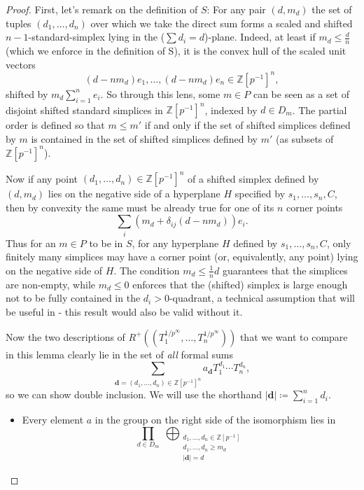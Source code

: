 \documentclass[10pt,a4paper]{amsart}
\newcommand{\ZZip}{\ZZ[p^{-1}]}
\newcommand{\ZZ}{\mathbb{Z}}
\newcommand{\pRoots}{{1/p^\infty}}
\begin{document}
\begin{proof}
    First, let's remark on the definition of \(S\): For any pair \((d,m_d)\) the set of tuples \((d_1,\dots,d_n)\) over which we take the direct sum forms a scaled and shifted \(n-1\)-standard-simplex lying in the (\(\sum d_i = d\))-plane. Indeed, at least if \(m_d\leq \frac dn\) (which we enforce in the definition of S), it is the convex hull of the scaled unit vectors 
    \[(d-nm_d)e_1,\dots, (d-nm_d)e_n\in \ZZip^n,\]
    shifted by \(m_d\sum_{i=1}^n e_i\). So through this lens, some \(m\in P\) can be seen as a set of disjoint shifted standard simplices in \(\ZZip^n\), indexed by \(d\in D_m\). The partial order is defined so that \(m\leq m'\) if and only if the set of shifted simplices defined by \(m\) is contained in the set of shifted simplices defined by \(m'\) (as subsets of \(\ZZip^n\)).\par
    Now if any point \((d_1,\dots,d_n)\in \ZZip^n\) of a shifted simplex defined by \((d, m_d)\) lies on the negative side of a hyperplane \(H\) specified by \(s_1,\dots,s_n,C\), then by convexity the same must be already true for one of its \(n\) corner points 
    \[\sum_i(m_d + \delta_{ij}(d-nm_d))e_i.\] 
    Thus for an \(m\in P\) to be in \(S\), for any hyperplane \(H\) defined by \(s_1,\dots,s_n,C\), only finitely many simplices may have a corner point (or, equivalently, any point) lying on the negative side of \(H\). The condition \(m_d\leq \frac 1n d\) guarantees that the simplices are non-empty, while \(m_d\leq 0\) enforces that the (shifted) simplex is large enough not to be fully contained in the \(d_i>0\)-quadrant, a technical assumption that will be useful in  - this result would also be valid without it.\par
    Now the two descriptions of \(R^+((T^{\pRoots}_1,\dots,T_n^{\pRoots}))\) that we want to compare in this lemma clearly lie in the set of \emph{all} formal sums
    \[\sum_{\mathbf{d}=(d_1,\dots,d_n)\in \ZZip^n}a_{\mathbf{d}}^{}T_1^{d_1}\cdots T_n^{d_n},\]
    so we can show double inclusion. We will use the shorthand \(|\mathbf d|\coloneqq \sum_{i=1}^n d_i\).
    \begin{itemize}
        \item["\(\supseteq\)":]  Every element \(a\) in the group on the right side of the isomorphism lies in
        \[\prod_{d\in D_m}
        \;\bigoplus_{\substack{d_1,\dots,d_n\in \ZZ[p^{-1}]\\
        d_1,\dots,d_n\geq m_d\\
        |\mathbf d|=d}}
\]
\end{itemize}
\end{proof}
\end{document}
